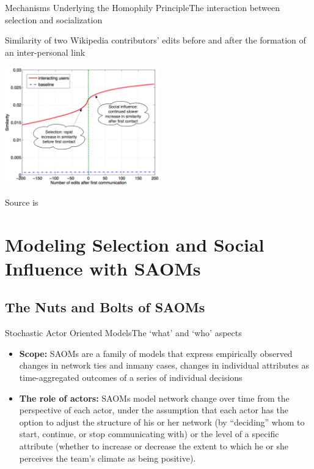 \documentclass[notes, aspectratio=1610]{beamer}
\begin{document}
\begin{frame}{Mechanisms Underlying the Homophily Principle}{The interaction 
	between selection and socialization}
	\centering 

	\small Similarity of two Wikipedia contributors' edits before and after 
	the formation of an inter-personal link

	\includegraphics[width=0.5\textwidth]{images/selection_and_socialization.png}

	\footnotesize Source is \cite{easley2010}
\end{frame}

\section{Modeling Selection and Social Influence with SAOMs}

\subsection{The Nuts and Bolts of SAOMs}

\begin{frame}{Stochastic Actor Oriented Models}{The `what' and `who' aspects}
	\begin{itemize}
		\item 
		\textbf{Scope:} SAOMs are a family of models that 
		express empirically observed changes in network ties and 
		inmany cases, changes in individual attributes as 
		time-aggregated outcomes of a series of individual decisions 
		\cite{snijders_2016}
		\item
		\textbf{The role of actors:} SAOMs model network change over time from the 
		perspective of each actor, under the assumption that each actor 
		has the option to adjust the structure of his or her network 
		(by ``deciding'' whom to start, continue, or stop communicating 
		with) or the level of a specific attribute (whether to increase 
		or decrease the extent to which he or she perceives the team's 
		climate as being positive). 
	\end{itemize}
\end{frame}
\end{document}
